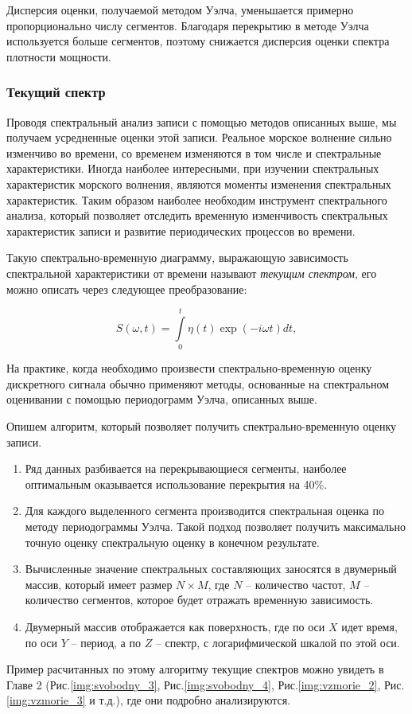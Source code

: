 Дисперсия оценки, получаемой методом Уэлча, уменьшается примерно пропорционально числу сегментов. Благодаря перекрытию в методе Уэлча используется больше сегментов, поэтому снижается дисперсия оценки спектра плотности мощности.


\subsubsection{Текущий спектр}

Проводя спектральный анализ записи с помощью методов описанных выше, мы получаем усредненные оценки этой записи. Реальное морское волнение сильно изменчиво во времени, со временем изменяются в том числе и спектральные характеристики. Иногда наиболее интересными, при изучении спектральных характеристик морского волнения, являются моменты изменения спектральных характеристик. Таким образом наиболее необходим инструмент спектрального анализа, который позволяет отследить временную изменчивость спектральных характеристик записи и развитие периодических процессов во времени.

Такую спектрально-временную диаграмму, выражающую зависимость спектральной характеристики от времени называют \emph{текущим спектром}, его можно описать через следующее преобразование:

\begin{equation}\label{eq:currSpectr}
  S(\omega,t)=\int\limits^{t}_0\eta(t)\exp(-i\omega t)dt,
\end{equation}

На практике, когда необходимо произвести спектрально-временную оценку дискретного сигнала обычно применяют методы, основанные на спектральном оценивании с помощью периодограмм Уэлча, описанных выше.

Опишем алгоритм, который позволяет получить спектрально-временную оценку записи.
\begin{enumerate}
  \item Ряд данных разбивается на перекрывающиеся сегменты, наиболее оптимальным оказывается использование перекрытия на 40\%.
  \item Для каждого выделенного сегмента производится спектральная оценка по методу периодограммы Уэлча. Такой подход позволяет получить максимально точную оценку спектральную оценку в конечном результате.
  \item Вычисленные значение спектральных составляющих заносятся в двумерный массив, который имеет размер $N\times M$, где $N$ -- количество частот, $M$ -- количество сегментов, которое будет отражать временную зависимость.
  \item Двумерный массив отображается как поверхность, где по оси $X$ идет время, по оси $Y$ – период, а по $Z$ – спектр, с логарифмической шкалой по этой оси.
\end{enumerate}
Пример расчитанных по этому алгоритму текущие спектров можно увидеть в Главе 2 (Рис.\ref{img:svobodny_3}, Рис.\ref{img:svobodny_4}, Рис.\ref{img:vzmorie_2}, Рис.\ref{img:vzmorie_3} и т.д.), где они подробно анализируются.




